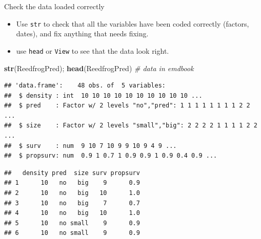 \documentclass[
  ignorenonframetext,
]{beamer}
\newenvironment{Shaded}{\begin{snugshade}}{\end{snugshade}}
\newcommand{\CommentTok}[1]{\textcolor[rgb]{0.56,0.35,0.01}{\textit{#1}}}
\newcommand{\KeywordTok}[1]{\textcolor[rgb]{0.13,0.29,0.53}{\textbf{#1}}}
\newcommand{\NormalTok}[1]{#1}
\providecommand{\tightlist}{%
  \setlength{\itemsep}{0pt}\setlength{\parskip}{0pt}}
\begin{document}
\begin{frame}[fragile]{Check the data loaded correctly}
\protect\hypertarget{check-the-data-loaded-correctly}{}

\begin{itemize}
\tightlist
\item
  Use \texttt{str} to check that all the variables have been coded
  correctly (factors, dates), and fix anything that needs fixing.
\item
  use \texttt{head} or \texttt{View} to see that the data look right.
\end{itemize}

\scriptsize

\begin{Shaded}
\begin{Highlighting}[]
\KeywordTok{str}\NormalTok{(ReedfrogPred); }\KeywordTok{head}\NormalTok{(ReedfrogPred) }\CommentTok{# data in emdbook}
\end{Highlighting}
\end{Shaded}

\begin{verbatim}
## 'data.frame':    48 obs. of  5 variables:
##  $ density : int  10 10 10 10 10 10 10 10 10 10 ...
##  $ pred    : Factor w/ 2 levels "no","pred": 1 1 1 1 1 1 1 1 2 2 ...
##  $ size    : Factor w/ 2 levels "small","big": 2 2 2 2 1 1 1 1 2 2 ...
##  $ surv    : num  9 10 7 10 9 9 10 9 4 9 ...
##  $ propsurv: num  0.9 1 0.7 1 0.9 0.9 1 0.9 0.4 0.9 ...
\end{verbatim}

\begin{verbatim}
##   density pred  size surv propsurv
## 1      10   no   big    9      0.9
## 2      10   no   big   10      1.0
## 3      10   no   big    7      0.7
## 4      10   no   big   10      1.0
## 5      10   no small    9      0.9
## 6      10   no small    9      0.9
\end{verbatim}

\end{frame}
\end{document}
